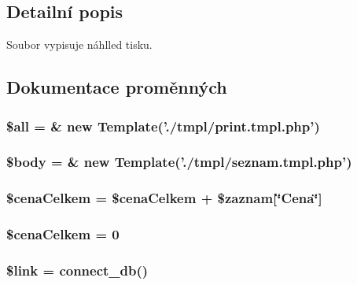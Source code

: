 \subsection{Detailní popis}
Soubor vypisuje náhlled tisku. 

\subsection{Dokumentace proměnných}
\subsubsection{\setlength{\rightskip}{0pt plus 5cm}\$all = \& new {\bf Template}('./tmpl/print.tmpl.php')}\label{seznam_8php_3c74ea9d2348c9aba28d36e692bef2d2}


\subsubsection{\setlength{\rightskip}{0pt plus 5cm}\$body = \& new {\bf Template}('./tmpl/seznam.tmpl.php')}\label{seznam_8php_26b9f9373f7bb79dfcf8a86dff086b45}


\subsubsection{\setlength{\rightskip}{0pt plus 5cm}\$cenaCelkem = \$cenaCelkem + \$zaznam[\char`\"{}Cena\char`\"{}]}\label{seznam_8php_2599a827926830c9019f0748a076c4fe}


\subsubsection{\setlength{\rightskip}{0pt plus 5cm}\$cenaCelkem = 0}\label{seznam_8php_2599a827926830c9019f0748a076c4fe}


\subsubsection{\setlength{\rightskip}{0pt plus 5cm}\$link = connect\_\-db()}\label{seznam_8php_5d346e31b75d916e3bac9cb193bfc97f}


